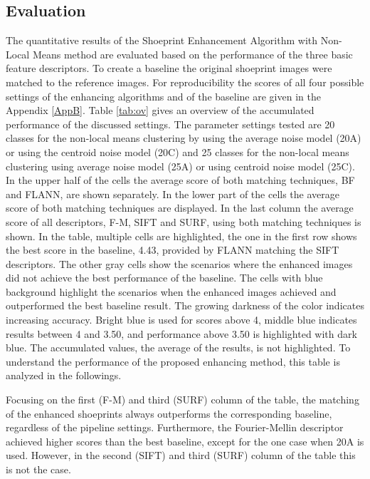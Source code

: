 \documentclass[draft,final]{vutinfth} %
\begin{document}
\subsection{Evaluation}
\par
The quantitative results of the Shoeprint Enhancement Algorithm with Non-Local Means method are evaluated based on the performance of  the three basic feature descriptors.
To create a baseline the original shoeprint images were matched to the reference images.
For reproducibility the scores of all four possible settings  of the enhancing algorithms and of the baseline are given in the Appendix \ref{AppB}.
Table \ref{tab:ov} gives an overview of the accumulated performance of the discussed settings.
The parameter settings tested are 20 classes for the non-local means clustering by using the average noise model (20A) or using the centroid noise model (20C) and 25 classes for the non-local means clustering using average noise model (25A) or using centroid noise model (25C). 
In the upper half of the cells the average score of both matching techniques, BF and FLANN, are shown separately.
In the lower part of the cells the average score of both matching techniques are displayed.
In the last column the average score of all descriptors, F-M, SIFT and SURF, using both matching techniques is shown.
In the table, multiple cells are highlighted, the one in the first row shows the best score in the baseline, 4.43, provided by FLANN matching the SIFT descriptors.
The other gray cells show the scenarios where the enhanced images did not achieve the best performance of the baseline.
The cells with blue background highlight the scenarios when the enhanced images achieved and outperformed the best baseline result. The growing darkness of the color indicates increasing accuracy.
Bright blue is used for scores above 4, middle blue indicates results between 4 and 3.50, and performance above 3.50 is highlighted with dark blue. 
The accumulated values, the average of the results, is not highlighted.
To understand the performance of the proposed enhancing method, this table is analyzed in the followings.
\par
Focusing on the first (F-M)  and third (SURF) column of the table, the matching of the enhanced shoeprints always outperforms the corresponding baseline, regardless of the pipeline settings.
Furthermore, the Fourier-Mellin descriptor achieved higher scores than the best baseline, except for the one case when 20A is used. 
However, in the second (SIFT) and third (SURF) column of the table this is not the case.
\end{document}
